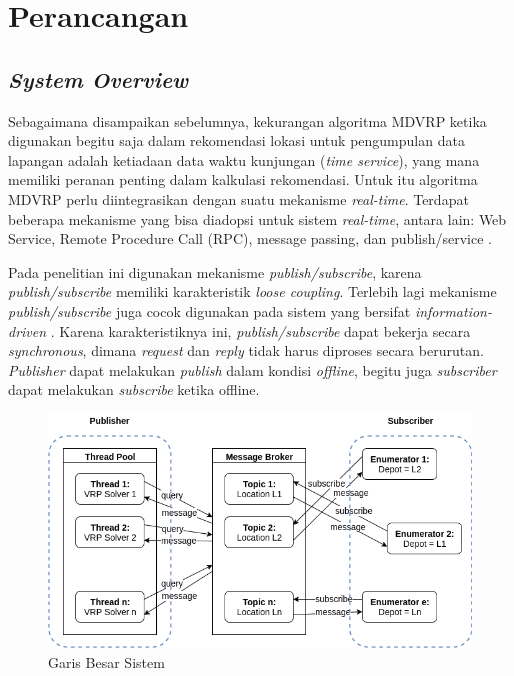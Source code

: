 \section{Perancangan}
\label{sec:design}


\subsection{\textit{System Overview}}
Sebagaimana disampaikan sebelumnya, kekurangan algoritma MDVRP ketika digunakan begitu saja dalam rekomendasi lokasi untuk pengumpulan data lapangan adalah ketiadaan data waktu kunjungan (\textit{time service}), yang mana memiliki peranan penting dalam kalkulasi rekomendasi. Untuk itu algoritma MDVRP perlu diintegrasikan dengan suatu mekanisme \textit{real-time}. Terdapat beberapa mekanisme yang bisa diadopsi untuk sistem \textit{real-time}, antara lain: Web Service, Remote Procedure Call (RPC), message passing, dan publish/service \citep{eugster_many_2003}.


Pada penelitian ini digunakan mekanisme \textit{publish/subscribe}, karena \textit{publish/subscribe} memiliki karakteristik \textit{loose coupling}. Terlebih lagi mekanisme \textit{publish/subscribe} juga cocok digunakan pada sistem yang bersifat \textit{information-driven} \citep{muhl_large-scale_2002}. Karena karakteristiknya ini, \textit{publish/subscribe} dapat bekerja secara \textit{synchronous}, dimana \textit{request} dan \textit{reply} tidak harus diproses secara berurutan. \textit{Publisher} dapat melakukan \textit{publish} dalam kondisi \textit{offline}, begitu juga \textit{subscriber} dapat melakukan \textit{subscribe} ketika offline.


\begin{figure}[h]
	\centering
	\includegraphics[width=\textwidth]{../../Resources/Images/system-overview}
	\caption{Garis Besar Sistem}
	\label{fig:system-overview}
\end{figure}


